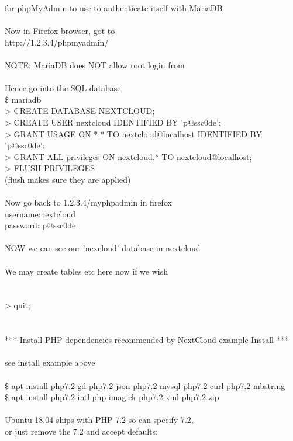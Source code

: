 \documentclass[10pt,a4paper]{article}
\begin{document}
{	for phpMyAdmin to use to authenticate itself with MariaDB\\
\\
	Now in Firefox browser, got to\\
	http://1.2.3.4/phpmyadmin/}{\large \\
\\
	NOTE: MariaDB does NOT allow root login from \\
	\\
	Hence go into the SQL database\\
	\$ mariadb\\
	> CREATE DATABASE NEXTCLOUD;\\
	> CREATE USER nextcloud IDENTIFIED BY 'p@ssc0de';\\
	> GRANT USAGE ON *.* TO nextcloud@localhost IDENTIFIED BY 'p@ssc0de';\\
	> GRANT ALL privileges ON nextcloud.* TO nextcloud@localhost;\\
	> FLUSH PRIVILEGES   \\
	(flush makes sure they are applied)\\
	\\
	Now go back to 1.2.3.4/myphpadmin in firefox\\
	username:nextcloud\\
	password: p@ssc0de\\
\\
	NOW we can see our 'nexcloud' database in nextcloud\\
\\
	We may create tables etc here now if we wish\\
	\\
\\
	> quit;\\
\\
\\
*** Install PHP dependencies recommended by NextCloud example Install ***\\
\\
	see install example above\\
\\
	\$ apt install php7.2-gd php7.2-json php7.2-mysql php7.2-curl php7.2-mbstring\\
	\$ apt install php7.2-intl php-imagick php7.2-xml php7.2-zip\\
\\
	Ubuntu 18.04 ships with PHP 7.2 so can specify 7.2, \\
	or just remove the 7.2 and accept defaults:\\
\\
}
\end{document}
